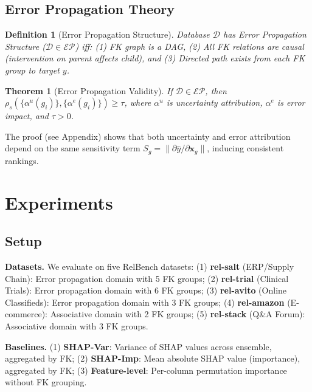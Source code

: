 \documentclass{article}
\newtheorem{theorem}{Theorem}
\newtheorem{definition}{Definition}
\begin{document}
\subsection{Error Propagation Theory}

\begin{definition}[Error Propagation Structure]
Database $\mathcal{D}$ has Error Propagation Structure ($\mathcal{D} \in \mathcal{EP}$) iff:
(1) FK graph is a DAG,
(2) All FK relations are causal (intervention on parent affects child), and
(3) Directed path exists from each FK group to target $y$.
\end{definition}

\begin{theorem}[Error Propagation Validity]
\label{thm:ep_valid}
If $\mathcal{D} \in \mathcal{EP}$, then $\rho_s(\{\alpha^u(g_i)\}, \{\alpha^e(g_i)\}) \geq \tau$,
where $\alpha^u$ is uncertainty attribution, $\alpha^e$ is error impact, and $\tau > 0$.
\end{theorem}

The proof (see Appendix) shows that both uncertainty and error attribution depend on
the same sensitivity term $S_g = \|\partial \hat{y}/\partial \mathbf{x}_g\|$, inducing consistent rankings.

\section{Experiments}
\label{sec:experiments}

\subsection{Setup}

\textbf{Datasets.} We evaluate on five RelBench datasets:
(1) \textbf{rel-salt} (ERP/Supply Chain): Error propagation domain with 5 FK groups;
(2) \textbf{rel-trial} (Clinical Trials): Error propagation domain with 6 FK groups;
(3) \textbf{rel-avito} (Online Classifieds): Error propagation domain with 3 FK groups;
(4) \textbf{rel-amazon} (E-commerce): Associative domain with 2 FK groups;
(5) \textbf{rel-stack} (Q\&A Forum): Associative domain with 3 FK groups.

\textbf{Baselines.}
(1) \textbf{SHAP-Var}: Variance of SHAP values across ensemble, aggregated by FK;
(2) \textbf{SHAP-Imp}: Mean absolute SHAP value (importance), aggregated by FK;
(3) \textbf{Feature-level}: Per-column permutation importance without FK grouping.
\end{document}
